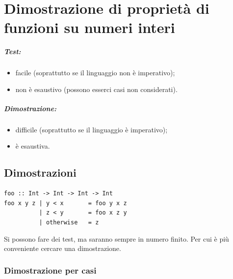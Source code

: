 \chapter{Dimostrazione di proprietà di funzioni su numeri interi}



\paragraph{Test:}

\begin{itemize}
    \item facile (soprattutto se il linguaggio non è imperativo);
    \item non è esaustivo (possono esserci casi non considerati).
\end{itemize}

\paragraph{Dimostrazione:}

\begin{itemize}
    \item difficile (soprattutto se il linguaggio è imperativo);
    \item è esaustiva.
\end{itemize}

\section{Dimostrazioni}

\begin{lstlisting}
foo :: Int -> Int -> Int -> Int
foo x y z | y < x       = foo y x z
          | z < y       = foo x z y
          | otherwise   = z
\end{lstlisting}


Si possono fare dei test, ma saranno sempre in numero finito. Per cui è più conveniente cercare una dimostrazione.

\subsection{Dimostrazione per casi}

